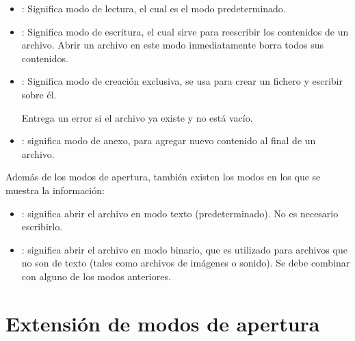 \begin{itemize}
  \item {}: Significa modo de lectura, el cual es el modo predeterminado.
  

  \item {}: Significa modo de escritura, el cual sirve para reescribir los contenidos de un archivo.
Abrir un archivo en este modo inmediatamente borra todos sus contenidos.
  

  \item {}: Significa modo de creación exclusiva, se usa para crear un fichero y escribir sobre él.
  

  Entrega un error  si el archivo ya existe y no está vacío.


  \item {}: significa modo de anexo, para agregar nuevo contenido al final de un archivo.


\end{itemize}

Además de los modos de apertura, también existen los modos en los que se muestra la información:

\begin{itemize}
  \item {}: significa abrir el archivo en modo texto (predeterminado).
No es necesario escribirlo.
  
  \item {}: significa abrir el archivo en modo binario, que es utilizado para archivos que no son de texto (tales como archivos de imágenes o sonido).
Se debe combinar con alguno de los modos anteriores.


\end{itemize}

\section{Extensión de modos de apertura}

